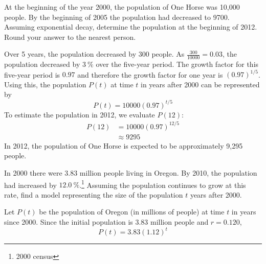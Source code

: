 \begin{pccexample}	
	At the beginning of the year 2000, the population of One Horse was 10,000 people. By the beginning
	of 2005 the population had decreased to 9700. Assuming exponential decay, determine the population 
	at the beginning of 2012. Round your answer to the nearest person.
	\begin{pccsolution}
		Over 5 years, the population decreased by 300 people.  As $\frac{300}{10000}=0.03$, the population 
		decreased by $\SI{3}{\percent}$ over the five-year period.  The growth factor for this five-year period is $0.97$ and 
		therefore the growth factor for one year is $(0.97)^{1/5}$.  Using this, the population $P(t)$ at 
		time $t$ in years after 2000 can be represented by
		\[
			P(t) = 10000\left(0.97\right)^{t/5}
		\]  
		To estimate the population in 2012, we evaluate $P(12)$:
		\begin{align*}
			P(12) & = 10000\left(0.97\right)^{12/5} \\
			      & \approx 9295                    
		\end{align*}
		In 2012, the population of One Horse is expected to be approximately 9,295 people.
	\end{pccsolution}
\end{pccexample}
\begin{doyouunderstand}
	\begin{problem}[Oregonians]
	In 2000 there were $3.83$  million people living in Oregon.  By 2010, the population had increased 
	by $\SI{12.0}{\percent}$.\footnote{2000 census}  Assuming the population continues to grow at this rate, find a 
	model representing the size of the population $t$ years after 2000.
	\begin{shortsolution}
		Let $P(t)$ be the population of Oregon (in millions of people) at time $t$ in years since 2000. 
		Since the initial population is 3.83 million people and $r=0.120$,
		\[
			P(t) = 3.83(1.12)^t
		\]
	\end{shortsolution}
	\end{problem}
\end{doyouunderstand}
			
